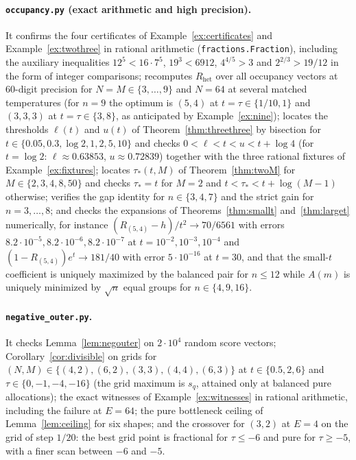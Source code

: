 \documentclass[11pt]{article}
\theoremstyle{plain}
\theoremstyle{definition}
\theoremstyle{remark}
\newcommand{\Rhet}{R_{\mathrm{het}}}
\begin{document}
\paragraph{\texttt{occupancy.py} (exact arithmetic and high precision).}
It confirms the four certificates of Example~\ref{ex:certificates} and Example~\ref{ex:twothree} in rational arithmetic (\texttt{fractions.Fraction}), including the auxiliary inequalities $12^5<16\cdot7^5$, $19^3<6912$, $4^{4/5}>3$ and $2^{2/3}>19/12$ in the form of integer comparisons; recomputes $\Rhet$ over all occupancy vectors at 60-digit precision for $N=M\in\{3,\dots,9\}$ and $N=64$ at several matched temperatures (for $n=9$ the optimum is $(5,4)$ at $t=\tau\in\{1/10,1\}$ and $(3,3,3)$ at $t=\tau\in\{3,8\}$, as anticipated by Example~\ref{ex:nine}); locates the thresholds $\ell(t)$ and $u(t)$ of Theorem~\ref{thm:threethree} by bisection for $t\in\{0.05,0.3,\log2,1,2,5,10\}$ and checks $0<\ell<t<u<t+\log4$ (for $t=\log2$: $\ell\approx0.63853$, $u\approx0.72839$) together with the three rational fixtures of Example~\ref{ex:fixtures}; locates $\tau_*(t,M)$ of Theorem~\ref{thm:twoM} for $M\in\{2,3,4,8,50\}$ and checks $\tau_*=t$ for $M=2$ and $t<\tau_*<t+\log(M-1)$ otherwise; verifies the gap identity for $n\in\{3,4,7\}$ and the strict gain for $n=3,\dots,8$; and checks the expansions of Theorems~\ref{thm:smallt} and~\ref{thm:larget} numerically, for instance $(R_{(5,4)}-h)/t^2\to70/6561$ with errors $8.2\cdot10^{-5},8.2\cdot10^{-6},8.2\cdot10^{-7}$ at $t=10^{-2},10^{-3},10^{-4}$ and $(1-R_{(5,4)})e^{t}\to181/40$ with error $5\cdot10^{-16}$ at $t=30$, and that the small-$t$ coefficient is uniquely maximized by the balanced pair for $n\le12$ while $A(m)$ is uniquely minimized by $\sqrt n$ equal groups for $n\in\{4,9,16\}$.

\paragraph{\texttt{negative\_outer.py}.}
It checks Lemma~\ref{lem:negouter} on $2\cdot10^4$ random score vectors; Corollary~\ref{cor:divisible} on grids for $(N,M)\in\{(4,2),(6,2),(3,3),(4,4),(6,3)\}$ at $t\in\{0.5,2,6\}$ and $\tau\in\{0,-1,-4,-16\}$ (the grid maximum is $s_q$, attained only at balanced pure allocations); the exact witnesses of Example~\ref{ex:witnesses} in rational arithmetic, including the failure at $E=64$; the pure bottleneck ceiling of Lemma~\ref{lem:ceiling} for six shapes; and the crossover for $(3,2)$ at $E=4$ on the grid of step $1/20$: the best grid point is fractional for $\tau\le-6$ and pure for $\tau\ge-5$, with a finer scan between $-6$ and $-5$.
\end{document}
